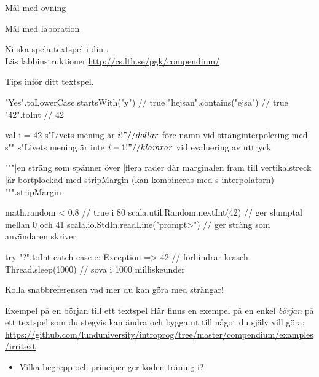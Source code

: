 \ifkompendium\else
{}

\begin{Slide}{Mål med övning \ExeWeekTHREE}
\begin{itemize}\SlideFontSmall
  
\end{itemize}
\end{Slide}

\begin{Slide}{Mål med laboration \LabWeekTHREE}
\begin{itemize}
  
\end{itemize}
Ni ska spela  textspel i din .\\
Läs labbinstruktioner:\url{http://cs.lth.se/pgk/compendium/}
\end{Slide}


\begin{Slide}{Tips inför ditt textspel.}
\begin{Code}
"Yes".toLowerCase.startsWith("y")    // true
"hejsan".contains("ejsa")            // true
"42".toInt                           // 42

val i = 42
s"Livets mening är $i!" // dollar $ före namn vid stränginterpolering med s""
s"Livets mening är inte ${i-1}!"  // klamrar ${} vid evaluering av uttryck

"""|en sträng som spänner över
   |flera rader där marginalen fram till vertikalstreck
   |är bortplockad med stripMargin (kan kombineras med s-interpolatorn)
""".stripMargin

math.random < 0.8                  // true i 80%
scala.util.Random.nextInt(42)      // ger slumptal mellan 0 och 41
scala.io.StdIn.readLine("prompt>") // ger sträng som användaren skriver

try { "?".toInt } catch { case e: Exception => 42 }  // förhindrar krasch
Thread.sleep(1000)    // sova i 1000 milliskeunder
\end{Code}
Kolla snabbreferensen vad mer du kan göra med strängar!
\end{Slide}

\begin{Slide}{Exempel på en början till ett textspel}
  Här finns en exempel på en enkel \emph{början} på ett textspel som du stegvis kan ändra och bygga ut till något du själv vill göra:
  \url{https://github.com/lunduniversity/introprog/tree/master/compendium/examples/irritext}

\begin{itemize}
  \item Vilka begrepp och principer ger koden träning i?
\end{itemize}

\end{Slide}
\fi
